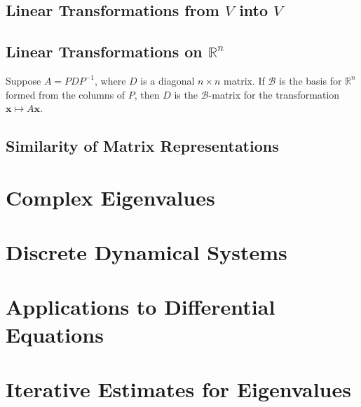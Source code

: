 \documentclass[12pt,a4paper]{article}
\renewcommand{\vec}[1]{\boldsymbol{#1}}
\begin{document}
\subsection{Linear Transformations from $V$ into $V$}




\subsection{Linear Transformations on $\mathbb R^n$}
\begin{tcolorbox}[colback=green!5,colframe=green!40!black,title= Diagonal Matrix Representation]
Suppose $A = PDP^{-1}$, where $D$ is a diagonal $n\times n$ matrix. If $\mathcal B$ is the basis for $\mathbb R^n$ formed from the columns of $P$, then $D$ is the $\mathcal B$-matrix for the transformation $\vec{x} \mapsto A \vec{x}$.
\end{tcolorbox}



\subsection{Similarity of Matrix Representations}





\section{Complex Eigenvalues}



\section{Discrete Dynamical Systems}



\section{Applications to Differential Equations}





\section{Iterative Estimates for Eigenvalues}
\end{document}
